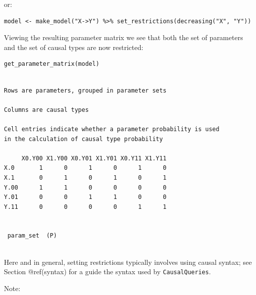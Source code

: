 \documentclass[
  article]{jss}
\begin{document}
or:

\begin{verbatim}
model <- make_model("X->Y") %>% set_restrictions(decreasing("X", "Y"))
\end{verbatim}

Viewing the resulting parameter matrix we see that both the set of
parameters and the set of causal types are now restricted:

\begin{verbatim}
get_parameter_matrix(model)
\end{verbatim}

\begin{verbatim}

Rows are parameters, grouped in parameter sets

Columns are causal types

Cell entries indicate whether a parameter probability is used
in the calculation of causal type probability

     X0.Y00 X1.Y00 X0.Y01 X1.Y01 X0.Y11 X1.Y11
X.0       1      0      1      0      1      0
X.1       0      1      0      1      0      1
Y.00      1      1      0      0      0      0
Y.01      0      0      1      1      0      0
Y.11      0      0      0      0      1      1

 
 param_set  (P)
 
\end{verbatim}

Here and in general, setting restrictions typically involves using
causal syntax; see Section @ref(syntax) for a guide the syntax used by
\texttt{CausalQueries}.

Note:
\end{document}
